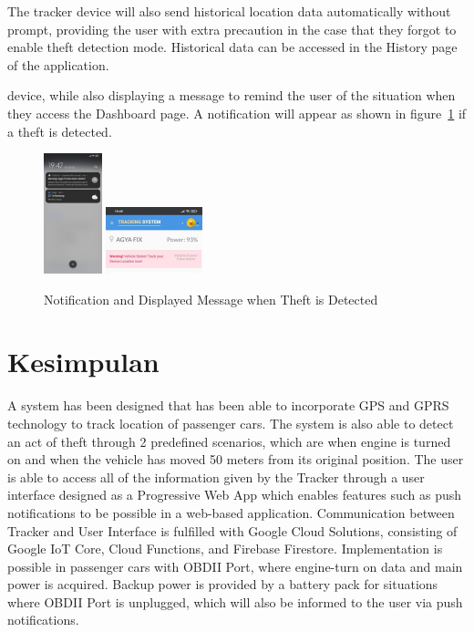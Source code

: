\documentclass[conference]{IEEEtran}
\begin{document}
The tracker device will also send historical location data automatically without prompt, providing the user with extra precaution in the case that they forgot to enable theft detection mode. Historical data can be accessed in the History page of the application.

device, while also displaying a message to remind the user of the situation when they access the Dashboard page. A notification will appear as shown in figure~\ref{fig7} if a theft is detected.
\begin{figure}[htbp]
    \centering
    \includegraphics[width=0.15\textwidth]{notif1}
    \includegraphics[width=0.25\textwidth]{notif2}
    \caption{Notification and Displayed Message when Theft is Detected}
    \label{fig7}
\end{figure}

\section{Kesimpulan}
A system has been designed that has been able to incorporate GPS and GPRS technology to track location of passenger cars. The system is also able to detect an act of theft through 2 predefined scenarios, which are when engine is turned on and when the vehicle has moved 50 meters from its original position. The user is able to access all of the information given by the Tracker through a user interface designed as a Progressive Web App which enables features such as push notifications to be possible in a web-based application. Communication between Tracker and User Interface is fulfilled with Google Cloud Solutions, consisting of Google IoT Core, Cloud Functions, and Firebase Firestore. Implementation is possible in passenger cars with OBDII Port, where engine-turn on data and main power is acquired. Backup power is provided by a battery pack for situations where OBDII Port is unplugged, which will also be informed to the user via push notifications. 
\end{document}
